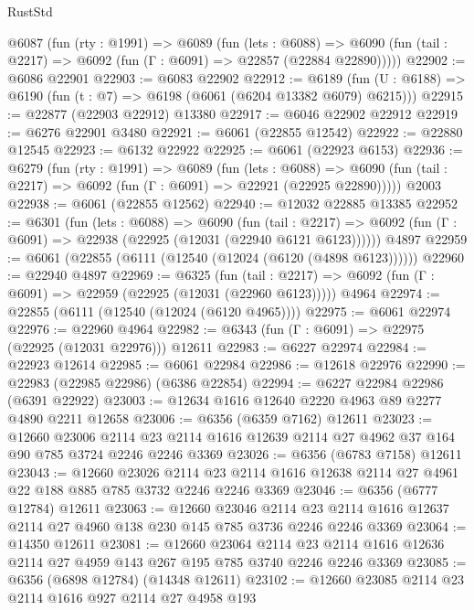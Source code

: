 \begin{lexlean}{RustStd}
\begin{coremodule}
{\begin{coremodule}
{{{{{{{{{{{{{{{{{{{{{{{{{{  @6087
    (fun (rty : @1991) =>
    @6089
      (fun (lets : @6088) =>
      @6090 (fun (tail : @2217) => @6092 (fun (Γ : @6091) => @22857 (@22884 @22890)))))
@22902 := @6086 @22901
@22903 := @6083 @22902
@22912 := @6189
    (fun (U : @6188) => @6190 (fun (t : @7) => @6198 (@6061 (@6204 @13382 @6079) @6215)))
@22915 := @22877 (@22903 @22912) @13380
@22917 := @6046 @22902 @22912
@22919 := @6276 @22901 @3480
@22921 := @6061 (@22855 @12542)
@22922 := @22880 @12545
@22923 := @6132 @22922
@22925 := @6061 (@22923 @6153)
@22936 := @6279
    (fun (rty : @1991) =>
    @6089
      (fun (lets : @6088) =>
      @6090 (fun (tail : @2217) => @6092 (fun (Γ : @6091) => @22921 (@22925 @22890)))))
    @2003
@22938 := @6061 (@22855 @12562)
@22940 := @12032 @22885 @13385
@22952 := @6301
    (fun (lets : @6088) =>
    @6090
      (fun (tail : @2217) =>
      @6092 (fun (Γ : @6091) => @22938 (@22925 (@12031 (@22940 @6121 @6123))))))
    @4897
@22959 := @6061 (@22855 (@6111 (@12540 (@12024 (@6120 (@4898 @6123))))))
@22960 := @22940 @4897
@22969 := @6325
    (fun (tail : @2217) => @6092 (fun (Γ : @6091) => @22959 (@22925 (@12031 (@22960 @6123)))))
    @4964
@22974 := @22855 (@6111 (@12540 (@12024 (@6120 @4965))))
@22975 := @6061 @22974
@22976 := @22960 @4964
@22982 := @6343 (fun (Γ : @6091) => @22975 (@22925 (@12031 @22976))) @12611
@22983 := @6227 @22974
@22984 := @22923 @12614
@22985 := @6061 @22984
@22986 := @12618 @22976
@22990 := @22983 (@22985 @22986) (@6386 @22854)
@22994 := @6227 @22984 @22986 (@6391 @22922)
@23003 := @12634 @1616 @12640 @2220 @4963 @89 @2277 @4890 @2211 @12658
@23006 := @6356 (@6359 @7162) @12611
@23023 := @12660
    @23006
    @2114
    @23
    @2114
    @1616
    @12639
    @2114
    @27
    @4962
    @37
    @164
    @90
    @785
    @3724
    @2246
    @2246
    @3369
@23026 := @6356 (@6783 @7158) @12611
@23043 := @12660
    @23026
    @2114
    @23
    @2114
    @1616
    @12638
    @2114
    @27
    @4961
    @22
    @188
    @885
    @785
    @3732
    @2246
    @2246
    @3369
@23046 := @6356 (@6777 @12784) @12611
@23063 := @12660
    @23046
    @2114
    @23
    @2114
    @1616
    @12637
    @2114
    @27
    @4960
    @138
    @230
    @145
    @785
    @3736
    @2246
    @2246
    @3369
@23064 := @14350 @12611
@23081 := @12660
    @23064
    @2114
    @23
    @2114
    @1616
    @12636
    @2114
    @27
    @4959
    @143
    @267
    @195
    @785
    @3740
    @2246
    @2246
    @3369
@23085 := @6356 (@6898 @12784) (@14348 @12611)
@23102 := @12660
    @23085
    @2114
    @23
    @2114
    @1616
    @927
    @2114
    @27
    @4958
    @193
}}}}}}}}}}}}}}}}}}}}}}}}}}
\end{coremodule}}
\end{coremodule}
\end{lexlean}
